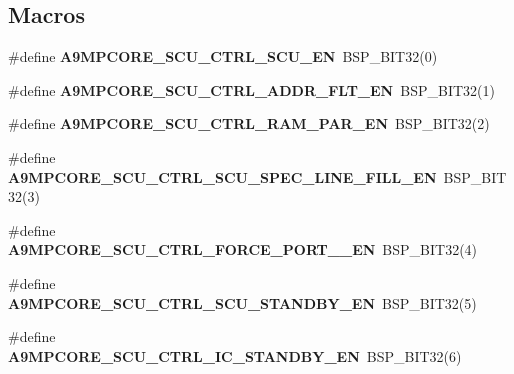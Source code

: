 \subsection*{Macros}
\begin{DoxyCompactItemize}
\item 
\mbox{\label{arm-a9mpcore-regs_8h_ab79a615f11528d51a83c8edbb76e5ccb}} 
\#define {\bfseries A9\+M\+P\+C\+O\+R\+E\+\_\+\+S\+C\+U\+\_\+\+C\+T\+R\+L\+\_\+\+S\+C\+U\+\_\+\+EN}~B\+S\+P\+\_\+\+B\+I\+T32(0)
\item 
\mbox{\label{arm-a9mpcore-regs_8h_a157634a1bb43cb6d6abd09867d64fbab}} 
\#define {\bfseries A9\+M\+P\+C\+O\+R\+E\+\_\+\+S\+C\+U\+\_\+\+C\+T\+R\+L\+\_\+\+A\+D\+D\+R\+\_\+\+F\+L\+T\+\_\+\+EN}~B\+S\+P\+\_\+\+B\+I\+T32(1)
\item 
\mbox{\label{arm-a9mpcore-regs_8h_a56b378902161b66a463cab6a74cae98c}} 
\#define {\bfseries A9\+M\+P\+C\+O\+R\+E\+\_\+\+S\+C\+U\+\_\+\+C\+T\+R\+L\+\_\+\+R\+A\+M\+\_\+\+P\+A\+R\+\_\+\+EN}~B\+S\+P\+\_\+\+B\+I\+T32(2)
\item 
\mbox{\label{arm-a9mpcore-regs_8h_ae58ea4fe3f21e0ef392ae885833608a7}} 
\#define {\bfseries A9\+M\+P\+C\+O\+R\+E\+\_\+\+S\+C\+U\+\_\+\+C\+T\+R\+L\+\_\+\+S\+C\+U\+\_\+\+S\+P\+E\+C\+\_\+\+L\+I\+N\+E\+\_\+\+F\+I\+L\+L\+\_\+\+EN}~B\+S\+P\+\_\+\+B\+I\+T32(3)
\item 
\mbox{\label{arm-a9mpcore-regs_8h_ab620ad112f15e3a02183e23d0ae4b707}} 
\#define {\bfseries A9\+M\+P\+C\+O\+R\+E\+\_\+\+S\+C\+U\+\_\+\+C\+T\+R\+L\+\_\+\+F\+O\+R\+C\+E\+\_\+\+P\+O\+R\+T\+\_\+\_\+\+EN}~B\+S\+P\+\_\+\+B\+I\+T32(4)
\item 
\mbox{\label{arm-a9mpcore-regs_8h_a90b9a5e59986fe55e7e3fff0a3a3e414}} 
\#define {\bfseries A9\+M\+P\+C\+O\+R\+E\+\_\+\+S\+C\+U\+\_\+\+C\+T\+R\+L\+\_\+\+S\+C\+U\+\_\+\+S\+T\+A\+N\+D\+B\+Y\+\_\+\+EN}~B\+S\+P\+\_\+\+B\+I\+T32(5)
\item 
\mbox{\label{arm-a9mpcore-regs_8h_a817e0af538f00bef48b6cb19d3e57d4c}} 
\#define {\bfseries A9\+M\+P\+C\+O\+R\+E\+\_\+\+S\+C\+U\+\_\+\+C\+T\+R\+L\+\_\+\+I\+C\+\_\+\+S\+T\+A\+N\+D\+B\+Y\+\_\+\+EN}~B\+S\+P\+\_\+\+B\+I\+T32(6)

\end{DoxyCompactItemize}
